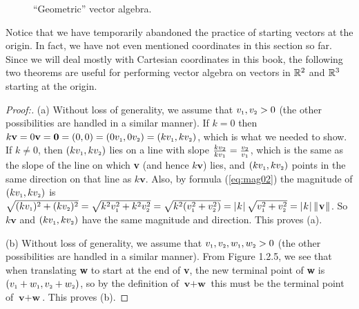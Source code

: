 \begin{figure}[h]
 \centering
 \qquad
 \qquad
 \caption[]{\quad ``Geometric'' vector algebra.}
 \label{fig:pgram}
\end{figure}

Notice that we have temporarily abandoned the practice of starting vectors at the origin. In fact, we have not even
mentioned coordinates in this section so far. Since we will deal mostly with Cartesian coordinates in this book, the
following two theorems are useful for performing vector algebra on vectors in $\mathbb{R}^{2}$ and $\mathbb{R}^{3}$
starting at the origin.

\begin{proofbar}\begin{proof}[Proof:] (a)
 Without loss of generality, we assume that $v_{\scriptscriptstyle 1}, v_{\scriptscriptstyle 2} > 0$ (the other
 possibilities are handled in a similar manner). If $k = 0$ then $k\textbf{v} = 0\textbf{v} = \textbf{0} = (0,0)
 = (0v_{\scriptscriptstyle 1},0v_{\scriptscriptstyle 2}) = (kv_{\scriptscriptstyle 1},kv_{\scriptscriptstyle 2})$, which
 is what we needed to show. If $k \ne 0$, then $(kv_{\scriptscriptstyle 1},kv_{\scriptscriptstyle 2})$ lies on a line
 with slope $\frac{kv_{\scriptscriptstyle 2}}{kv_{\scriptscriptstyle 1}} =
 \frac{v_{\scriptscriptstyle 2}}{v_{\scriptscriptstyle 1}}$, which is the same as the slope of the line on which
 \textbf{v} (and hence $k\textbf{v}$) lies, and $(kv_{\scriptscriptstyle 1},kv_{\scriptscriptstyle 2})$ points in the
 same direction on that line as $k\textbf{v}$.  Also, by formula (\ref{eq:mag02}) the magnitude of
 $(kv_{\scriptscriptstyle 1},kv_{\scriptscriptstyle 2})$ is $\sqrt{(kv_{\scriptscriptstyle 1})^2 +
 (kv_{\scriptscriptstyle 2})^2} = \sqrt{k^2 v_{\scriptscriptstyle 1}^2 + k^2 v_{\scriptscriptstyle 2}^2} = \sqrt{k^2 (v_{\scriptscriptstyle 1}^2 + v_{\scriptscriptstyle 2}^2)} =
 \lvert\mspace{1mu}k\mspace{1mu}\rvert \,\sqrt{v_{\scriptscriptstyle 1}^2 + v_{\scriptscriptstyle 2}^2} = \lvert\mspace{1mu}k\mspace{1mu}\rvert \,\lVert\mspace{1mu}\textbf{v}\mspace{1mu}\rVert$.
 So $k\textbf{v}$ and $(kv_{\scriptscriptstyle 1},kv_{\scriptscriptstyle 2})$ have the same magnitude and direction.
 This proves (a).
 \smallskip
 
 \piccaption[]{}
 \par\noindent(b)
 Without loss of generality, we assume that $v_{\scriptscriptstyle 1}, v_{\scriptscriptstyle 2},
 w_{\scriptscriptstyle 1},w_{\scriptscriptstyle 2} > 0$ (the other possibilities are handled in a similar manner).
 From Figure 1.2.5, we see that when translating \textbf{w} to start at the end of \textbf{v}, the new
 terminal point of \textbf{w} is $(v_{\scriptscriptstyle 1} + w_{\scriptscriptstyle 1}, v_{\scriptscriptstyle 2} + w_{\scriptscriptstyle 2})$, so by the definition of $\textbf{v} + \textbf{w}$ this must
 be the terminal point of $\textbf{v} + \textbf{w}$. 
 This proves (b).
\end{proof}\end{proofbar}
